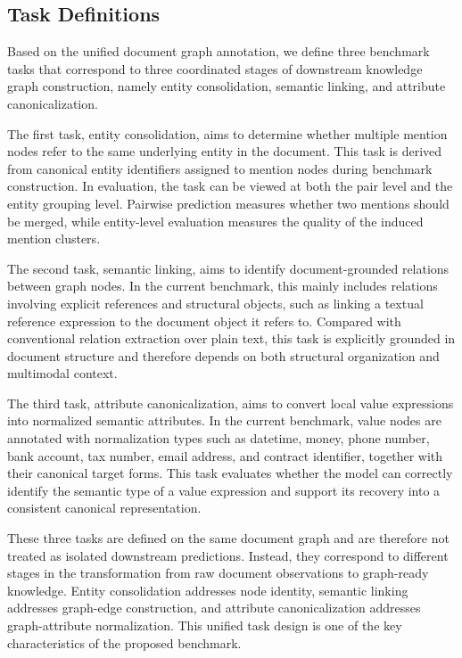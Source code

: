 \documentclass[pdflatex,twocolumn,iicol,sn-vancouver-num]{sn-jnl}%
\theoremstyle{thmstyleone}%
\theoremstyle{thmstyletwo}%
\theoremstyle{thmstylethree}%
\begin{document}
\subsection{Task Definitions}

Based on the unified document graph annotation, we define three benchmark tasks that correspond to three coordinated stages of downstream knowledge graph construction, namely entity consolidation, semantic linking, and attribute canonicalization.

The first task, entity consolidation, aims to determine whether multiple mention nodes refer to the same underlying entity in the document. This task is derived from canonical entity identifiers assigned to mention nodes during benchmark construction. In evaluation, the task can be viewed at both the pair level and the entity grouping level. Pairwise prediction measures whether two mentions should be merged, while entity-level evaluation measures the quality of the induced mention clusters.

The second task, semantic linking, aims to identify document-grounded relations between graph nodes. In the current benchmark, this mainly includes relations involving explicit references and structural objects, such as linking a textual reference expression to the document object it refers to. Compared with conventional relation extraction over plain text, this task is explicitly grounded in document structure and therefore depends on both structural organization and multimodal context.

The third task, attribute canonicalization, aims to convert local value expressions into normalized semantic attributes. In the current benchmark, value nodes are annotated with normalization types such as datetime, money, phone number, bank account, tax number, email address, and contract identifier, together with their canonical target forms. This task evaluates whether the model can correctly identify the semantic type of a value expression and support its recovery into a consistent canonical representation.

These three tasks are defined on the same document graph and are therefore not treated as isolated downstream predictions. Instead, they correspond to different stages in the transformation from raw document observations to graph-ready knowledge. Entity consolidation addresses node identity, semantic linking addresses graph-edge construction, and attribute canonicalization addresses graph-attribute normalization. This unified task design is one of the key characteristics of the proposed benchmark.
\end{document}
